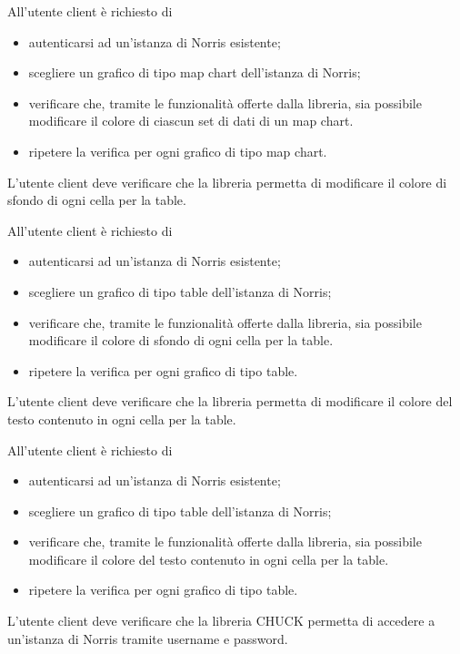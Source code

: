 		All'utente client è richiesto di
		\begin{itemize}
			\item autenticarsi ad un'istanza di Norris esistente;
			\item scegliere un grafico di tipo map chart dell'istanza di Norris;
			\item verificare che, tramite le funzionalità offerte dalla libreria, sia possibile modificare il colore di ciascun set di dati di un map chart.
			\item ripetere la verifica per ogni grafico di tipo map chart.
		\end{itemize}

	L'utente client deve verificare che la libreria permetta di modificare il colore di sfondo di ogni cella per la table.
		
		All'utente client è richiesto di
		\begin{itemize}
			\item autenticarsi ad un'istanza di Norris esistente;
			\item scegliere un grafico di tipo table dell'istanza di Norris;
			\item verificare che, tramite le funzionalità offerte dalla libreria, sia possibile modificare il colore di sfondo di ogni cella per la table.
			\item ripetere la verifica per ogni grafico di tipo table.
		\end{itemize}

	L'utente client deve verificare che la libreria permetta di modificare il colore del testo contenuto in ogni cella per la table.
		
		All'utente client è richiesto di
		\begin{itemize}
			\item autenticarsi ad un'istanza di Norris esistente;
			\item scegliere un grafico di tipo table dell'istanza di Norris;
			\item verificare che, tramite le funzionalità offerte dalla libreria, sia possibile modificare il colore del testo contenuto in ogni cella per la table.
			\item ripetere la verifica per ogni grafico di tipo table.
		\end{itemize}

	L'utente client deve verificare che la libreria CHUCK permetta di accedere a un'istanza di Norris tramite username e password.
		
